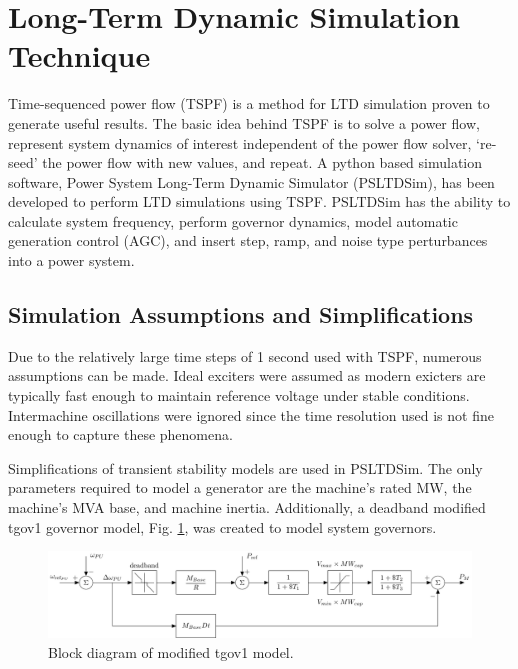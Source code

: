 \section{Long-Term Dynamic Simulation Technique}
Time-sequenced power flow (TSPF) is a method for LTD simulation proven to generate useful results\cite{DonnellyVoltageControl}.
The basic idea behind TSPF is to solve a power flow, represent system dynamics of interest independent of the power flow solver, `re-seed' the power flow with new values, and repeat.
A python based simulation software, Power System Long-Term Dynamic Simulator (PSLTDSim), has been developed to perform LTD simulations using TSPF.
PSLTDSim has the ability to calculate system frequency, perform governor dynamics, model automatic generation control (AGC), and insert step, ramp, and noise type perturbances into a power system.

\subsection{Simulation Assumptions and Simplifications}
Due to the relatively large time steps of 1 second used with TSPF, numerous assumptions can be made.
Ideal exciters were assumed as modern exicters are typically fast enough to maintain reference voltage under stable conditions.
Intermachine oscillations were ignored since the time resolution used is not fine enough to capture these phenomena.

Simplifications of transient stability models are used in PSLTDSim.
The only parameters required to model a generator are the machine's rated MW, the machine's MVA base, and machine inertia.
Additionally, a deadband modified tgov1 governor model, Fig. \ref{fig: tgov1BlockDiagram},  was created to model system governors.

\begin{figure}[!ht]
	\centering
	\includegraphics[width=\linewidth]{figures/tgov1DB}
	\caption{Block diagram of modified tgov1 model.}
	\label{fig: tgov1BlockDiagram}
\end{figure}

